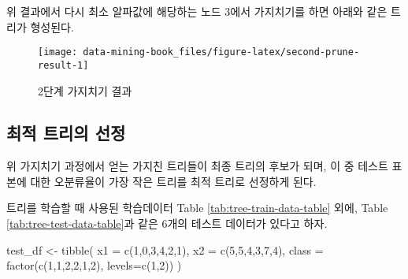 \documentclass[
]{book}
\newenvironment{Shaded}{\begin{snugshade}}{\end{snugshade}}
\newcommand{\AttributeTok}[1]{\textcolor[rgb]{0.77,0.63,0.00}{#1}}
\newcommand{\DecValTok}[1]{\textcolor[rgb]{0.00,0.00,0.81}{#1}}
\newcommand{\FloatTok}[1]{\textcolor[rgb]{0.00,0.00,0.81}{#1}}
\newcommand{\FunctionTok}[1]{\textcolor[rgb]{0.00,0.00,0.00}{#1}}
\newcommand{\NormalTok}[1]{#1}
\newcommand{\OtherTok}[1]{\textcolor[rgb]{0.56,0.35,0.01}{#1}}
\newcommand{\SpecialCharTok}[1]{\textcolor[rgb]{0.00,0.00,0.00}{#1}}
\begin{document}
위 결과에서 다시 최소 알파값에 해당하는 노드 3에서 가지치기를 하면 아래와 같은 트리가 형성된다.

\begin{Shaded}
\end{Shaded}

\begin{figure}

{\centering \texttt{[image: data-mining-book\_files/figure-latex/second-prune-result-1]} 

}

\caption{2단계 가지치기 결과}\label{fig:second-prune-result}
\end{figure}

\hypertarget{cart-best-tree}{%
\subsection{최적 트리의 선정}\label{cart-best-tree}}

위 가지치기 과정에서 얻는 가지친 트리들이 최종 트리의 후보가 되며, 이 중 테스트 표본에 대한 오분류율이 가장 작은 트리를 최적 트리로 선정하게 된다.

트리를 학습할 때 사용된 학습데이터 Table \ref{tab:tree-train-data-table} 외에, Table \ref{tab:tree-test-data-table}과 같은 6개의 테스트 데이터가 있다고 하자.

\begin{Shaded}
\begin{Highlighting}[]
\NormalTok{test\_df }\OtherTok{\textless{}{-}} \FunctionTok{tibble}\NormalTok{(}
  \AttributeTok{x1 =} \FunctionTok{c}\NormalTok{(}\DecValTok{1}\NormalTok{,}\DecValTok{0}\NormalTok{,}\DecValTok{3}\NormalTok{,}\DecValTok{4}\NormalTok{,}\DecValTok{2}\NormalTok{,}\DecValTok{1}\NormalTok{),}
  \AttributeTok{x2 =} \FunctionTok{c}\NormalTok{(}\DecValTok{5}\NormalTok{,}\DecValTok{5}\NormalTok{,}\DecValTok{4}\NormalTok{,}\DecValTok{3}\NormalTok{,}\DecValTok{7}\NormalTok{,}\DecValTok{4}\NormalTok{),}
  \AttributeTok{class =} \FunctionTok{factor}\NormalTok{(}\FunctionTok{c}\NormalTok{(}\DecValTok{1}\NormalTok{,}\DecValTok{1}\NormalTok{,}\DecValTok{2}\NormalTok{,}\DecValTok{2}\NormalTok{,}\DecValTok{1}\NormalTok{,}\DecValTok{2}\NormalTok{), }\AttributeTok{levels=}\FunctionTok{c}\NormalTok{(}\DecValTok{1}\NormalTok{,}\DecValTok{2}\NormalTok{))}
\NormalTok{)}
\end{Highlighting}
\end{Shaded}
\end{document}
